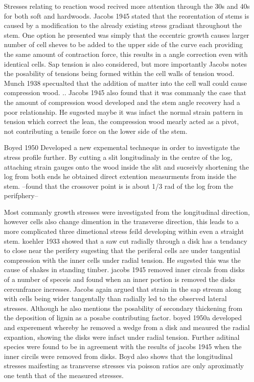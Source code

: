 \documentclass{article}
\begin{document}
Stresses relating to reaction wood recived more attention through the 30s and
40s for both soft and hardwoods. Jacobs 1945 stated that the reorentation of
stems is caused by a modification to the already existing stress gradiant
throughout the stem. One option he presented was simply that the eccentric
growth causes larger number of cell sheves to be added to the upper side of the
curve each providing the same amount of contraction force, this results in a
angle correction even with identical cells. Sap tension is also considered, but
more importantly Jacobs notes the posability of tensions being formed within the
cell walls of tension wood.
Munch 1938 specualted that the addition of matter into the cell wall could cause
compression wood. ..
Jacobs 1945 also found that it was commanly the case that the amount of
compression wood developed and the stem angle recovery had a poor relationship.
He sugested maybe it was infact the normal strain pattern in tension which
correct the lean, the compression wood mearly acted as a pivot, not contributing
a tensile force on the lower side of the stem.

Boyed 1950 Developed a new expemental techneque in order to investigate the
stress profile further. By cutting a slit longitudinaly in the centre of the
log, attaching strain gauges onto the wood inside the slit and sucseivly
shortening the log from both ends he obtained direct extention measurments from
inside the stem. --found that the crossover point is is about 1/3 rad of the log
from the perifphery--

Most commanly growth stresses were investigated from the longitudinal direction,
however cells also change dimention in the transverse direction, this leads to a
more complicated three dimetional stress feild developing within even a straight
stem.
koehler 1933 showed that a saw cut radially through a disk has a tendancy to
close near the perifery sugesting that the periferal cells are under tangential
compression with the inner cells under radial tension. He sugested this was the
cause of shakes in standing timber.
jacobs 1945 removed inner circals from disks of a number of speceis and found
when an inner portion is removed the disks cercunfrance incresses. Jacobs again
argued that strain in the sap stream along with cells being wider tangentally
than radially led to the observed lateral stresses. Although he also mentions
the posability of secondary thickening from the deposition of lignin as a
posabe contributing factor.
boyed 1950a developed and experement whereby he removed a wedge from a disk and
meaured the radial expantion, showing the disks were infact under radial
tension. Further aditinal species were found to be in agreement with the results
of jacobs 1945 when the inner circils were removed from disks. Boyd also shows
that the longitudinal stresses maifesting as transverse stresses via poisson
ratios are only aproximatly one tenth that of the measured stresses.
\end{document}
